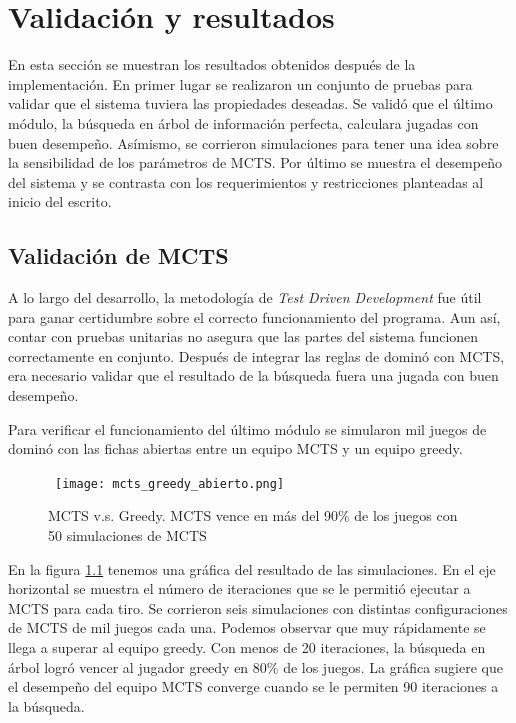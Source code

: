 \chapter{Validación y resultados}

\noindent
En esta sección se muestran los resultados obtenidos después de la implementación. En 
primer lugar se realizaron un conjunto de pruebas para validar que el sistema tuviera las 
propiedades deseadas. Se validó que el último módulo, la búsqueda en árbol de información 
perfecta, calculara jugadas con buen desempeño. Asímismo, se corrieron simulaciones para 
tener una idea sobre la sensibilidad de los parámetros de MCTS. Por último se muestra el 
desempeño del sistema y se contrasta con los requerimientos y restricciones planteadas al 
inicio del escrito.

\section{Validación de MCTS}

A lo largo del desarrollo, la metodología de  \textit{Test Driven Development} fue útil para ganar 
certidumbre sobre el correcto funcionamiento del programa. Aun así, contar con pruebas 
unitarias no asegura que las partes del sistema funcionen correctamente en conjunto. 
Después de integrar las reglas de dominó con MCTS, era necesario validar que el resultado 
de la búsqueda fuera una jugada con buen desempeño. 

Para verificar el funcionamiento del último módulo se simularon mil juegos de dominó con 
las fichas abiertas entre un equipo MCTS y un equipo greedy. 

\begin{figure}[ht]
\begin{center}
\hbox{\hspace{-1em} \texttt{[image: mcts\_greedy\_abierto.png]}}
\caption{MCTS v.s. Greedy. MCTS vence en más del 90\% de los juegos con 50 simulaciones de MCTS}
\label{MGA}
\end{center}
\end{figure}

En la figura \ref{MGA} tenemos una gráfica del resultado de las simulaciones. En el eje 
horizontal se muestra el número de iteraciones que se le permitió ejecutar a MCTS para 
cada tiro. Se corrieron seis simulaciones con distintas configuraciones de MCTS de mil 
juegos cada una. Podemos observar que muy rápidamente se llega a superar al equipo 
greedy. Con menos de 20 iteraciones, la búsqueda en árbol logró vencer al jugador greedy 
en 80\% de los juegos. La gráfica sugiere que el desempeño del equipo MCTS converge 
cuando se le permiten 90 iteraciones a la búsqueda.

